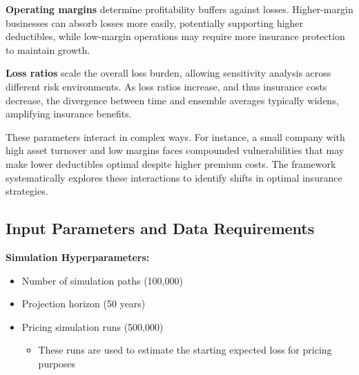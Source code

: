 \documentclass[11pt,letterpaper]{article}
\begin{document}
\textbf{Operating margins} determine profitability buffers against losses. Higher-margin businesses can absorb losses more easily, potentially supporting higher deductibles, while low-margin operations may require more insurance protection to maintain growth.

\textbf{Loss ratios} scale the overall loss burden, allowing sensitivity analysis across different risk environments. As loss ratios increase, and thus insurance costs decrease, the divergence between time and ensemble averages typically widens, amplifying insurance benefits.

These parameters interact in complex ways. For instance, a small company with high asset turnover and low margins faces compounded vulnerabilities that may make lower deductibles optimal despite higher premium costs. The framework systematically explores these interactions to identify shifts in optimal insurance strategies.

\subsection{Input Parameters and Data Requirements}

\textbf{Simulation Hyperparameters:}
\begin{itemize}
    \item Number of simulation paths (100,000)
    \item Projection horizon (50 years)
    \item Pricing simulation runs (500,000)
        \begin{itemize}[label=$\circ$]
            \item These runs are used to estimate the starting expected loss for pricing purposes
        \end{itemize}
\end{itemize}
\end{document}
